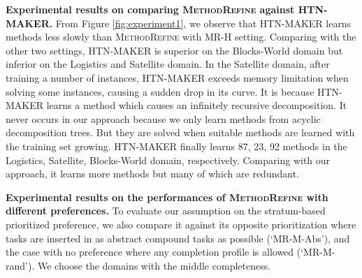 \documentclass[letterpaper]{article} %
\begin{document}
\textbf{Experimental results on comparing \textsc{MethodRefine} against HTN-MAKER.}
From Figure \ref{fig:experiment1}, we observe that HTN-MAKER learns methods less slowly than \textsc{MethodRefine} with MR-H setting.
Comparing with the other two settings, HTN-MAKER is superior on the Blocks-World domain but inferior on the Logistics and Satellite domain.
In the Satellite domain, after training a number of instances, HTN-MAKER exceeds memory limitation when solving some instances, causing a sudden drop in its curve.
It is because HTN-MAKER learns a method which causes an infinitely recursive decomposition.
It never occurs in our approach because we only learn methods from acyclic decomposition trees.
But they are solved when suitable methods are learned with the training set growing.
HTN-MAKER finally learns 87, 23, 92 methods in the Logistics, Satellite, Blocks-World domain, respectively. Comparing with our approach, it learns more methods but many of which are redundant.
%
%

\textbf{Experimental results on the performances of \textsc{MethodRefine} with different preferences.}
To evaluate our assumption on the stratum-based prioritized preference, we also compare it against its opposite prioritization where tasks are inserted in as abstract compound tasks as possible (`MR-M-Abs'), and the case with no preference where any completion profile is allowed (`MR-M-rand').
We choose the domains with the middle completeness.
\end{document}
